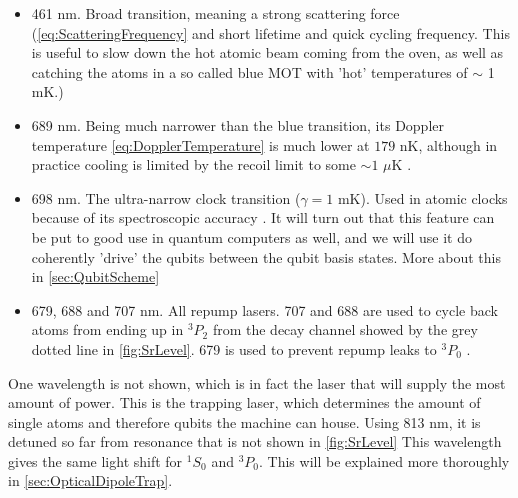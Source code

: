 \begin{itemize}
	\item 461 nm. Broad transition, meaning a strong scattering force (\cref{eq:ScatteringFrequency} and short lifetime and quick cycling frequency. This is useful to slow down the hot atomic beam coming from the oven, as well as catching the atoms in a so called blue MOT with 'hot' temperatures of $\sim$ 1 mK.)
	
	\item 689 nm. Being much narrower than the blue transition, its Doppler temperature \cref{eq:DopplerTemperature} is much lower at $179$ nK, although in practice cooling is limited by the recoil limit to some $\sim 1$ $\mu$K \cite{Boyd2007,Stellmer2013}.
	
	\item 698 nm. The ultra-narrow clock transition ($\gamma = 1$ mK). Used in atomic clocks because of its spectroscopic accuracy \cite{Bloom2014}. It will turn out that this feature can be put to good use in quantum computers as well, and we will use it do coherently 'drive' the qubits between the qubit basis states. More about this in \cref{sec:QubitScheme}
	
	\item 679, 688 and 707 nm. All repump lasers. 707 and 688 are used to cycle back atoms from ending up in ${}^3P_2$ from the decay channel showed by the grey dotted line in \cref{fig:SrLevel}. 679 is used to prevent repump leaks to ${}^3P_0$ \cite{Stellmer2013,Xu2003}.
\end{itemize}

One wavelength is not shown, which is in fact the laser that will supply the most amount of power. This is the trapping laser, which determines the amount of single atoms and therefore qubits the machine can house. Using 813 nm, it is detuned so far from resonance that is not shown in \cref{fig:SrLevel} This wavelength gives the same light shift for ${}^1S_0$ and ${}^3 P_0$. This will be explained more thoroughly in \cref{sec:OpticalDipoleTrap}. 

